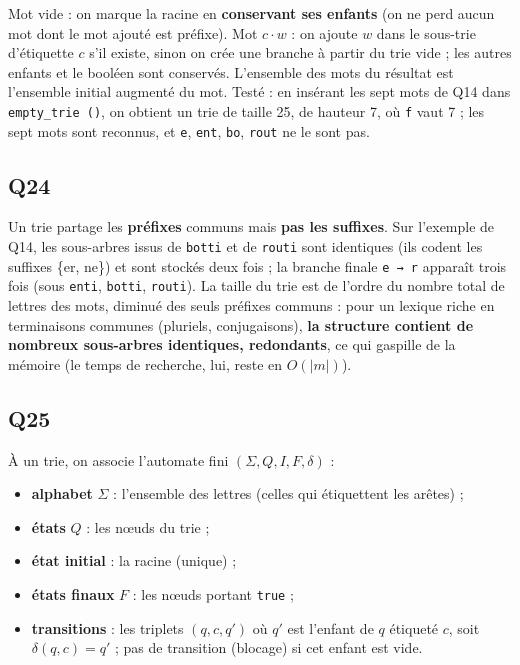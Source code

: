 \documentclass[11pt,a4paper]{article}
\providecommand{\tightlist}{\setlength{\itemsep}{0pt}\setlength{\parskip}{0pt}}
\begin{document}
Mot vide : on marque la racine en \textbf{conservant ses enfants} (on ne perd aucun mot dont le mot ajouté est préfixe). Mot \(c \cdot w\) : on ajoute \(w\) dans le sous-trie d'étiquette \(c\) s'il existe, sinon on crée une branche à partir du trie vide ; les autres enfants et le booléen sont conservés. L'ensemble des mots du résultat est l'ensemble initial augmenté du mot. Testé : en insérant les sept mots de Q14 dans \texttt{empty\_trie\ ()}, on obtient un trie de taille 25, de hauteur 7, où \texttt{f} vaut 7 ; les sept mots sont reconnus, et \texttt{e}, \texttt{ent}, \texttt{bo}, \texttt{rout} ne le sont pas.

\hypertarget{q24}{%
\subsection{Q24}\label{q24}}

Un trie partage les \textbf{préfixes} communs mais \textbf{pas les suffixes}. Sur l'exemple de Q14, les sous-arbres issus de \texttt{botti} et de \texttt{routi} sont identiques (ils codent les suffixes \{er, ne\}) et sont stockés deux fois ; la branche finale \texttt{e\ →\ r} apparaît trois fois (sous \texttt{enti}, \texttt{botti}, \texttt{routi}). La taille du trie est de l'ordre du nombre total de lettres des mots, diminué des seuls préfixes communs : pour un lexique riche en terminaisons communes (pluriels, conjugaisons), \textbf{la structure contient de nombreux sous-arbres identiques, redondants}, ce qui gaspille de la mémoire (le temps de recherche, lui, reste en \(O(|m|)\)).

\hypertarget{q25}{%
\subsection{Q25}\label{q25}}

À un trie, on associe l'automate fini \((\Sigma, Q, I, F, \delta)\) :

\begin{itemize}
\tightlist
\item
  \textbf{alphabet} \(\Sigma\) : l'ensemble des lettres (celles qui étiquettent les arêtes) ;
\item
  \textbf{états} \(Q\) : les nœuds du trie ;
\item
  \textbf{état initial} : la racine (unique) ;
\item
  \textbf{états finaux} \(F\) : les nœuds portant \texttt{true} ;
\item
  \textbf{transitions} : les triplets \((q, c, q')\) où \(q'\) est l'enfant de \(q\) étiqueté \(c\), soit \(\delta(q, c) = q'\) ; pas de transition (blocage) si cet enfant est vide.
\end{itemize}
\end{document}
